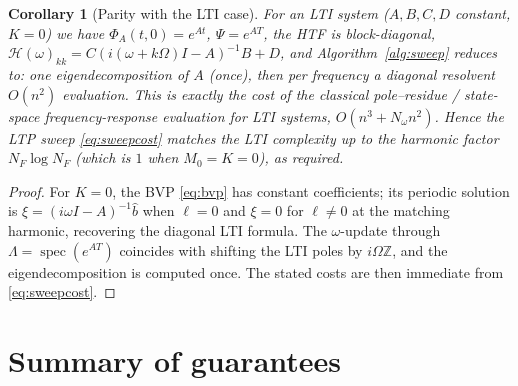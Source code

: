 \documentclass{amsart}
\newtheorem{corollary}{Corollary}
\theoremstyle{definition}
\DeclareMathOperator{\spec}{spec}
\newcommand{\Z}{\mathbb{Z}}
\newcommand{\Hcal}{\mathcal{H}}
\begin{document}
\begin{corollary}[Parity with the LTI case]\label{cor:lti}
For an LTI system ($A,B,C,D$ constant, $K=0$) we have $\Phi_A(t,0)=e^{At}$,
$\Psi=e^{AT}$, the HTF is block-diagonal,
$\Hcal(\omega)_{kk}=C(i(\omega+k\Omega)I-A)^{-1}B+D$, and
Algorithm~\ref{alg:sweep} reduces to: one eigendecomposition of $A$ (once), then
per frequency a diagonal resolvent $O(n^2)$ evaluation. This is exactly the cost
of the classical pole–residue / state-space frequency-response evaluation for
LTI systems, $O(n^3+N_\omega n^2)$. Hence the LTP sweep \eqref{eq:sweepcost}
matches the LTI complexity up to the harmonic factor $N_F\log N_F$ (which is
$1$ when $M_0=K=0$), as required.
\end{corollary}

\begin{proof}
For $K=0$, the BVP \eqref{eq:bvp} has constant coefficients; its periodic
solution is $\xi=(i\omega I-A)^{-1}\hat b$ when $\ell=0$ and $\xi=0$ for
$\ell\ne0$ at the matching harmonic, recovering the diagonal LTI formula. The
$\omega$-update through $\Lambda=\spec(e^{AT})$ coincides with shifting the LTI
poles by $i\Omega\Z$, and the eigendecomposition is computed once. The stated
costs are then immediate from \eqref{eq:sweepcost}.
\end{proof}

\section{Summary of guarantees}
\end{document}
